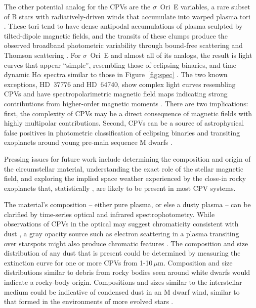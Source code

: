 \documentclass{nature3}
\begin{document}
The other potential analog for the CPVs are the $\sigma$~Ori~E
variables, a rare subset of B stars with radiatively-driven winds that
accumulate into warped plasma tori \cite{Townsend2005,Townsend2008}.
These tori tend to have dense antipodal accumulations of plasma
sculpted by tilted-dipole magnetic fields, and the transits of these
clumps produce the observed broadband photometric
variability through bound-free scattering \cite{Townsend2005} and
Thomson scattering \cite{Berry2022}.  For $\sigma$~Ori~E and almost
all of its analogs, the result is light curves that appear ``simple'',
resembling those of eclipsing binaries, and time-dynamic H$\alpha$
spectra similar to those in Figure~\ref{fig:spec}
\cite{Townsend2005,Townsend2008}.  The two known exceptions, HD~37776
and HD~64740, show complex light curves resembling CPVs
\cite{Mikulasek2020,Bouma2024} and have spectropolarimetric magnetic
field maps indicating strong contributions from higher-order magnetic
moments \cite{Kochukhov2011,Shultz2018}.  There are two implications:
first, the complexity of CPVs may be a direct consequence of magnetic
fields with highly multipolar contributions.  Second, CPVs can be a
source of astrophysical false positives in photometric classification
of eclipsing binaries and transiting exoplanets around young pre-main
sequence M dwarfs \cite{Johns-Krull2016,Bouma2020}.

Pressing issues for future work include determining the composition
and origin of the circumstellar material, understanding the exact role
of the stellar magnetic field, and exploring the implied space weather
experienced by the close-in rocky exoplanets that, statistically
\cite{Dressing2015}, are likely to be present in most CPV systems.

The material's composition -- either pure plasma, or else a dusty
plasma -- can be clarified by time-series optical and infrared
spectrophotometry.  While observations of CPVs in the optical may
suggest chromaticity consistent with dust
\cite{Tanimoto2020,Gunther2022,Koen2023}, a gray opacity source such
as electron scattering in a plasma transiting over starspots might
also produce chromatic features \cite{Rackham2018}.  The composition
and size distribution of any dust that is present could be determined
by measuring the extinction curve for one or more CPVs from
1-10\,$\mu$m.  Composition and size distributions similar to debris
from rocky bodies seen around white dwarfs \cite{Reach2009} would
indicate a rocky-body origin.  Compositions and sizes similar to the
interstellar medium could be indicative of condensed dust in an M
dwarf wind, similar to that formed in the environments of more evolved
stars \cite{Marigo2008}.
\end{document}
